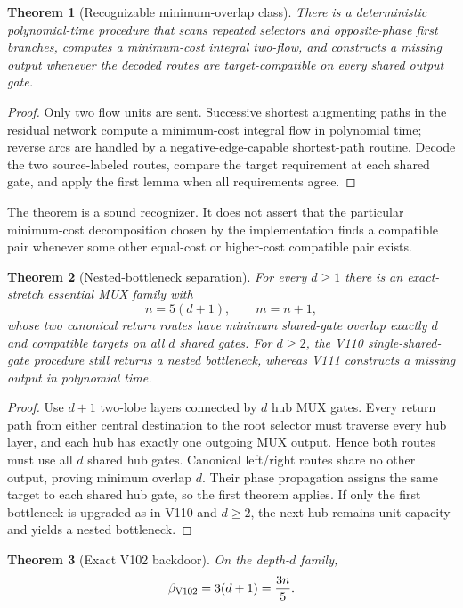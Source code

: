 \documentclass[11pt]{article}
\newtheorem{theorem}{Theorem}
\begin{document}
\begin{theorem}[Recognizable minimum-overlap class]
There is a deterministic polynomial-time procedure that scans repeated selectors
and opposite-phase first branches, computes a minimum-cost integral two-flow,
and constructs a missing output whenever the decoded routes are target-compatible
on every shared output gate.
\end{theorem}

\begin{proof}
Only two flow units are sent.  Successive shortest augmenting paths in the
residual network compute a minimum-cost integral flow in polynomial time; reverse
arcs are handled by a negative-edge-capable shortest-path routine.  Decode the
two source-labeled routes, compare the target requirement at each shared gate,
and apply the first lemma when all requirements agree.
\end{proof}

The theorem is a sound recognizer.  It does not assert that the particular
minimum-cost decomposition chosen by the implementation finds a compatible pair
whenever some other equal-cost or higher-cost compatible pair exists.

\begin{theorem}[Nested-bottleneck separation]
For every $d\ge 1$ there is an exact-stretch essential MUX family with
\[
 n=5(d+1),\qquad m=n+1,
\]
whose two canonical return routes have minimum shared-gate overlap exactly $d$
and compatible targets on all $d$ shared gates.  For $d\ge2$, the V110
single-shared-gate procedure still returns a nested bottleneck, whereas V111
constructs a missing output in polynomial time.
\end{theorem}

\begin{proof}
Use $d+1$ two-lobe layers connected by $d$ hub MUX gates.  Every return path from
either central destination to the root selector must traverse every hub layer,
and each hub has exactly one outgoing MUX output.  Hence both routes must use all
$d$ shared hub gates.  Canonical left/right routes share no other output, proving
minimum overlap $d$.  Their phase propagation assigns the same target to each
shared hub gate, so the first theorem applies.  If only the first bottleneck is
upgraded as in V110 and $d\ge2$, the next hub remains unit-capacity and yields a
nested bottleneck.
\end{proof}

\begin{theorem}[Exact V102 backdoor]
On the depth-$d$ family,
\[
 \beta_{\rm V102}=3(d+1)=\frac{3n}{5}.
\]
\end{theorem}
\end{document}
